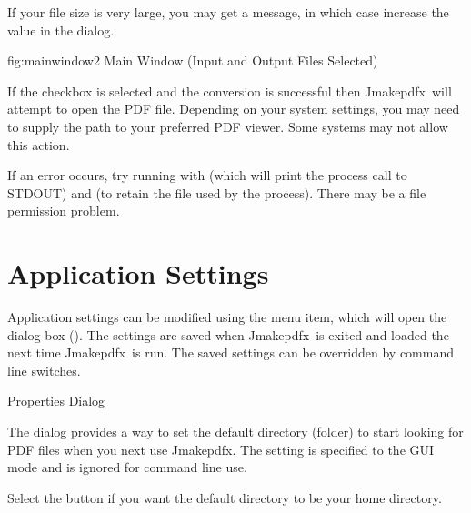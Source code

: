 \documentclass[toc=listof]{scrreport}
\newcommand{\Jmakepdfx}{Jmakepdfx}
\begin{document}
\begin{warning}
If your file size is very large, you may get a
 message, in which case  
increase the
 value in the  dialog.
\end{warning}

\FloatFig
 {fig:mainwindow2}
 {%
 }
 {Main Window (Input and Output Files Selected)}

If the  checkbox is selected and the conversion is
successful then \Jmakepdfx\ will attempt to open the PDF file.
Depending on your system settings, you may need to supply the path
to your preferred PDF viewer. Some systems may not allow this
action.

\begin{information}
If an error occurs, try running  with
 (which will print the process call to STDOUT) 
and  (to retain the file used by the process).
There may be a file permission problem.
\end{information}

\chapter{Application Settings}
\label{sec:settings}

Application settings can be modified using the
 menu item, which will open the
 dialog box ().
The settings are saved when \Jmakepdfx\ is exited and loaded the
next time \Jmakepdfx\ is run. The saved settings can be overridden
by command line switches.

 {%
 }
 {Properties Dialog}


The  dialog provides a way to set the default
directory (folder) to start looking for PDF files when you next use
\Jmakepdfx. The  setting is
specified to the \gls{GUI} mode and is ignored for command line use.

Select the  button if you want the
default directory to be your home directory.
\end{document}
